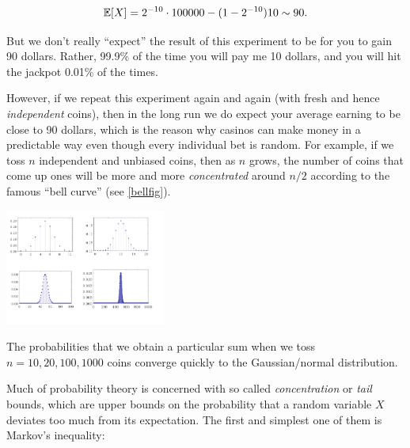 \begin{equation*}
\operatorname*{\mathbb E}[X] = 2^{-10}\cdot 100000 - (1-2^{-10})10 \sim 90 .
\end{equation*}

But we don't really ``expect'' the result of this experiment to be for
you to gain 90 dollars. Rather, 99.9\% of the time you will pay me 10
dollars, and you will hit the jackpot 0.01\% of the times.

However, if we repeat this experiment again and again (with fresh and
hence \emph{independent} coins), then in the long run we do expect your
average earning to be close to 90 dollars, which is the reason why
casinos can make money in a predictable way even though every individual
bet is random. For example, if we toss \(n\) independent and unbiased
coins, then as \(n\) grows, the number of coins that come up ones will
be more and more \emph{concentrated} around \(n/2\) according to the
famous ``bell curve'' (see \cref{bellfig}).

\begin{marginfigure}
\centering
\includegraphics[width=\linewidth, height=1.5in, keepaspectratio]{../figure/binomial.png}
\caption{The probabilities that we obtain a particular sum when we toss
\(n=10,20,100,1000\) coins converge quickly to the Gaussian/normal
distribution.}
\label{bellfig}
\end{marginfigure}

Much of probability theory is concerned with so called
\emph{concentration} or \emph{tail} bounds, which are upper bounds on
the probability that a random variable \(X\) deviates too much from its
expectation. The first and simplest one of them is Markov's inequality:

\hypertarget{markovthm}{}

